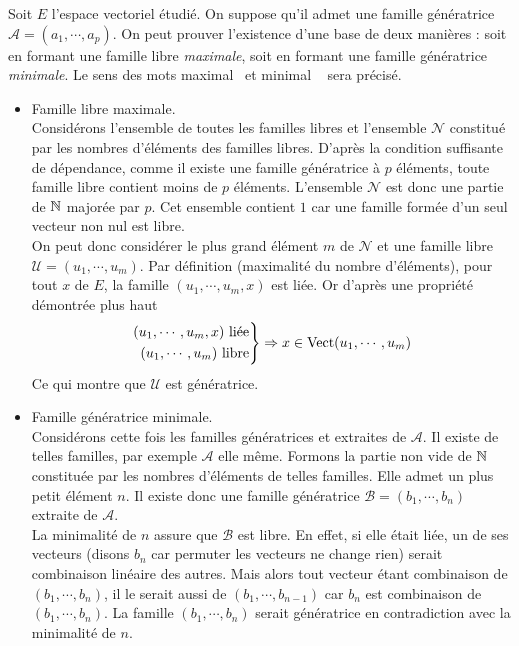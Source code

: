 \begin{demo}
 Soit $E$ l'espace vectoriel étudié. On suppose qu'il admet une famille génératrice $\mathcal A =(a_1,\cdots,a_p)$. On peut prouver l'existence d'une base de deux manières : soit en formant une famille libre \emph{maximale}, soit en formant une famille génératrice \emph{minimale}. Le sens des mots \og maximal\fg~ et \og minimal \fg~ sera précisé.
\begin{itemize}
 \item Famille libre maximale.\\
Considérons l'ensemble de toutes les familles libres et l'ensemble $\mathcal N$ constitué par les nombres d'éléments des familles libres. D'après la condition suffisante de dépendance, comme il existe une famille génératrice à $p$ éléments, toute famille libre contient moins de $p$ éléments. L'ensemble $\mathcal N$ est donc une partie de $\mathbb{N}$ majorée par $p$. Cet ensemble contient $1$ car une famille formée d'un seul vecteur non nul est libre.\\
On peut donc considérer le plus grand élément $m$ de $\mathcal N$ et une famille libre $\mathcal U = (u_1,\cdots,u_m)$. Par définition (maximalité du nombre d'éléments), pour tout $x$ de $E$, la famille $(u_1,\cdots,u_m,x)$ est liée. Or d'après une propriété démontrée plus haut
\begin{displaymath}
 \left. 
\begin{aligned}
 (u_1,\cdots,u_m,x)\text{ liée}\\
 (u_1,\cdots,u_m)\text{ libre}
\end{aligned}
\right\rbrace \Rightarrow
x\in \mathop{\mathrm{Vect}}(u_1,\cdots,u_m)
\end{displaymath}
  Ce qui montre que $\mathcal U$ est génératrice.

\item Famille génératrice minimale.\\
Considérons cette fois les familles génératrices et extraites de $\mathcal A$. Il existe de telles familles, par exemple $\mathcal A$ elle même. Formons la partie non vide de $\mathbb{N}$ constituée par les nombres d'éléments de telles familles. Elle admet un plus petit élément $n$. Il existe donc une famille génératrice $\mathcal B =(b_1,\cdots,b_n)$ extraite de $\mathcal A$. \\
La minimalité de $n$ assure que $\mathcal B$ est libre. En effet, si elle était liée, un de ses vecteurs (disons $b_n$ car permuter les vecteurs ne change rien) serait combinaison linéaire des autres. Mais alors tout vecteur étant combinaison de $(b_1,\cdots,b_n)$, il le serait aussi de $(b_1,\cdots,b_{n-1})$ car $b_n$ est combinaison de $(b_1,\cdots,b_n)$. La famille $(b_1,\cdots,b_n)$ serait génératrice en contradiction avec la minimalité de $n$.
\end{itemize}
\end{demo}

